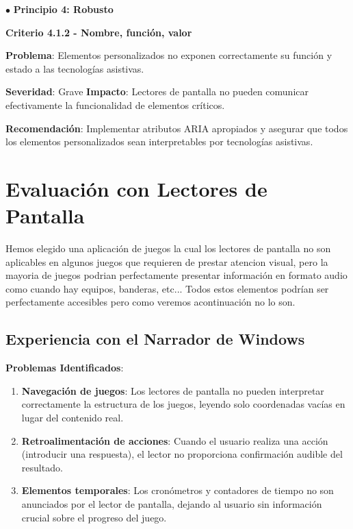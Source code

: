 \documentclass{article}
\begin{document}
	\vspace{0.3cm}
	\noindent
	$\bullet$ \textbf{Principio 4: Robusto}
	\vspace{0.3cm}
	
	\noindent
	\textbf{Criterio 4.1.2 - Nombre, función, valor}
	
	\noindent
	\textbf{Problema}: Elementos personalizados no exponen correctamente su función y estado a las tecnologías asistivas.
	
	\noindent
	\textbf{Severidad}: Grave
	\noindent
	\textbf{Impacto}: Lectores de pantalla no pueden comunicar efectivamente la funcionalidad de elementos críticos.
	
	\noindent
	\textbf{Recomendación}: Implementar atributos ARIA apropiados y asegurar que todos los elementos personalizados sean interpretables por tecnologías asistivas.

	\section{Evaluación con Lectores de Pantalla}
	\noindent Hemos elegido una aplicación de juegos la cual los lectores de pantalla no son aplicables en algunos juegos que requieren de prestar atencion visual, pero la mayoria de juegos podrian perfectamente presentar información en formato audio como cuando hay equipos, banderas, etc... Todos estos elementos podrían ser perfectamente accesibles pero como veremos acontinuación no lo son.
	
	

	\subsection{Experiencia con el Narrador de Windows}
	
	\noindent
	\textbf{Problemas Identificados}:
	\begin{enumerate}
		\item \textbf{Navegación de juegos}: Los lectores de pantalla no pueden interpretar correctamente la estructura de los juegos, leyendo solo coordenadas vacías en lugar del contenido real.
		\item \textbf{Retroalimentación de acciones}: Cuando el usuario realiza una acción (introducir una respuesta), el lector no proporciona confirmación audible del resultado.
		\item \textbf{Elementos temporales}: Los cronómetros y contadores de tiempo no son anunciados por el lector de pantalla, dejando al usuario sin información crucial sobre el progreso del juego.
	\end{enumerate}
\end{document}
